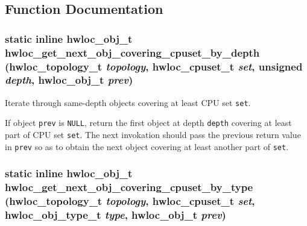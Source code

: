 \subsection{Function Documentation}
\hypertarget{group__hwlocality__helper__find__coverings_g39cbd3f1608d0fe503d396430cffe219}{
\subsubsection[{hwloc\_\-get\_\-next\_\-obj\_\-covering\_\-cpuset\_\-by\_\-depth}]{\setlength{\rightskip}{0pt plus 5cm}static inline {\bf hwloc\_\-obj\_\-t} hwloc\_\-get\_\-next\_\-obj\_\-covering\_\-cpuset\_\-by\_\-depth ({\bf hwloc\_\-topology\_\-t} {\em topology}, \/  {\bf hwloc\_\-cpuset\_\-t} {\em set}, \/  unsigned {\em depth}, \/  {\bf hwloc\_\-obj\_\-t} {\em prev})}}
\label{group__hwlocality__helper__find__coverings_g39cbd3f1608d0fe503d396430cffe219}


Iterate through same-depth objects covering at least CPU set {\tt set}. 

If object {\tt prev} is {\tt NULL}, return the first object at depth {\tt depth} covering at least part of CPU set {\tt set}. The next invokation should pass the previous return value in {\tt prev} so as to obtain the next object covering at least another part of {\tt set}. \hypertarget{group__hwlocality__helper__find__coverings_gad89905a7c9388283535296802d766cb}{
\subsubsection[{hwloc\_\-get\_\-next\_\-obj\_\-covering\_\-cpuset\_\-by\_\-type}]{\setlength{\rightskip}{0pt plus 5cm}static inline {\bf hwloc\_\-obj\_\-t} hwloc\_\-get\_\-next\_\-obj\_\-covering\_\-cpuset\_\-by\_\-type ({\bf hwloc\_\-topology\_\-t} {\em topology}, \/  {\bf hwloc\_\-cpuset\_\-t} {\em set}, \/  {\bf hwloc\_\-obj\_\-type\_\-t} {\em type}, \/  {\bf hwloc\_\-obj\_\-t} {\em prev})}}
\label{group__hwlocality__helper__find__coverings_gad89905a7c9388283535296802d766cb}


